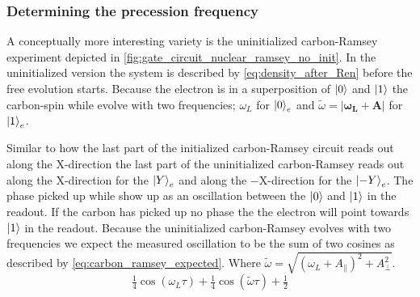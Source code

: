 \subsubsection{Determining the precession frequency}

A conceptually more interesting variety is the uninitialized carbon-Ramsey experiment depicted in \cref{fig:gate_circuit_nuclear_ramsey_no_init}.
In the uninitialized version the system is described by \cref{eq:density_after_Ren} before the free evolution starts.
Because the electron is in a superposition of ${\left\vert{0}\right\rangle}$ and ${\left\vert{1}\right\rangle}$ the carbon-spin while evolve with two frequencies; $\omega_L$ for ${\left\vert{0}\right\rangle}_e$ and $\tilde{\omega} = \bm{|\omega_L + A |} $ for ${\left\vert{1}\right\rangle}_e$.

Similar to how the last part of the initialized carbon-Ramsey circuit reads out along the X-direction the last part of the uninitialized carbon-Ramsey reads out along the X-direction for the ${\left\vert{Y}\right\rangle}_e$ and along the $-$X-direction for the ${\left\vert{-Y}\right\rangle}_e$.
The phase picked up while show up as an oscillation between the ${\left\vert{0}\right\rangle}$ and ${\left\vert{1}\right\rangle}$ in the readout.
If the carbon has picked up no phase the the electron will point towards ${\left\vert{1}\right\rangle}$ in the readout.
Because the uninitialized carbon-Ramsey evolves with two frequencies we expect the measured oscillation to be the sum of two cosines as described by \cref{eq:carbon_ramsey_expected}. Where $ \tilde\omega =   \sqrt{(\omega_L+A_\parallel) ^2 + A_\perp^2} $.
\begin{equation}
    \tfrac{1}{4} \cos(\omega_L \tau ) +\tfrac{1}{4}  \cos (\tilde{\omega} \tau ) + \tfrac{1}{2}
    \label{eq:carbon_ramsey_expected}
\end{equation}


